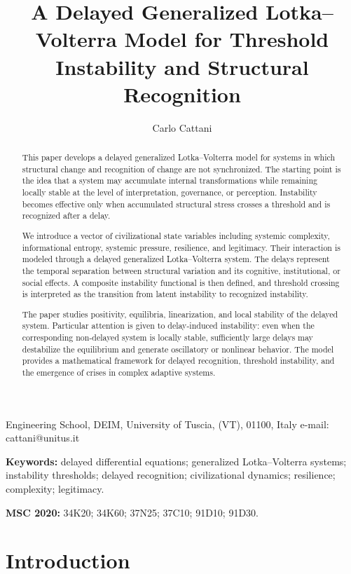 \documentclass[11pt]{article}
\title{A Delayed Generalized Lotka--Volterra Model for Threshold Instability and Structural Recognition}
\author{Carlo Cattani}
\date{}
\begin{document}
\maketitle

\begin{center}	
	Engineering School, DEIM,  University of Tuscia, (VT), 01100, Italy
	e-mail: cattani@unitus.it	
\end{center}

\begin{abstract}
This paper develops a delayed generalized Lotka--Volterra model for systems in which structural change and recognition of change are not synchronized. The starting point is the idea that a system may accumulate internal transformations while remaining locally stable at the level of interpretation, governance, or perception. Instability becomes effective only when accumulated structural stress crosses a threshold and is recognized after a delay.

We introduce a vector of civilizational state variables including systemic complexity, informational entropy, systemic pressure, resilience, and legitimacy. Their interaction is modeled through a delayed generalized Lotka--Volterra system. The delays represent the temporal separation between structural variation and its cognitive, institutional, or social effects. A composite instability functional is then defined, and threshold crossing is interpreted as the transition from latent instability to recognized instability.

The paper studies positivity, equilibria, linearization, and local stability of the delayed system. Particular attention is given to delay-induced instability: even when the corresponding non-delayed system is locally stable, sufficiently large delays may destabilize the equilibrium and generate oscillatory or nonlinear behavior. The model provides a mathematical framework for delayed recognition, threshold instability, and the emergence of crises in complex adaptive systems.
\end{abstract}

\noindent\textbf{Keywords:} delayed differential equations; generalized Lotka--Volterra systems; instability thresholds; delayed recognition; civilizational dynamics; resilience; complexity; legitimacy.

\noindent\textbf{MSC 2020:} 34K20; 34K60; 37N25; 37C10; 91D10; 91D30.

\section{Introduction}
\end{document}
